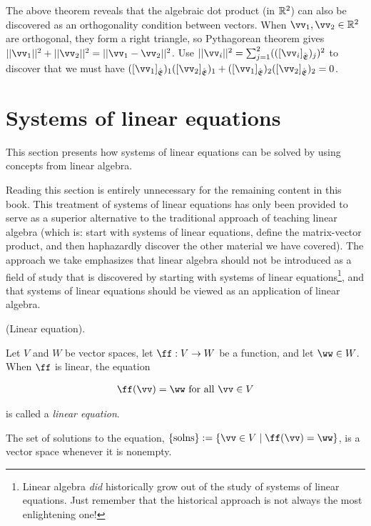 \begin{remark}
    The above theorem reveals that the algebraic dot product (in $\mathbb{R}^2$) can also be discovered as an orthogonality condition between vectors. When $\vv_1, \vv_2 \in \R^2$ are orthogonal, they form a right triangle, so Pythagorean theorem gives $||\vv_1||^2 + ||\vv_2||^2 = ||\vv_1 - \vv_2||^2$. Use $||\vv_i||^2 = \sum_{j = 1}^2 (([\vv_i]_\sE)_j)^2$ to discover that we must have $([\vv_1]_\sE)_1 ([\vv_2]_\sE)_1 + ([\vv_1]_\sE)_2 ([\vv_2]_\sE)_2 = 0$.
\end{remark}

\newpage

\section{Systems of linear equations}

This section presents how systems of linear equations can be solved by using concepts from linear algebra.

Reading this section is entirely unnecessary for the remaining content in this book. This treatment of systems of linear equations has only been provided to serve as a superior alternative to the traditional approach of teaching linear algebra (which is: start with systems of linear equations, define the matrix-vector product, and then haphazardly discover the other material we have covered). The approach we take emphasizes that linear algebra should not be introduced as a field of study that is discovered by starting with systems of linear equations\footnote{Linear algebra \textit{did} historically grow out of the study of systems of linear equations. Just remember that the historical approach is not always the most enlightening one!}, and that systems of linear equations should be viewed as an application of linear algebra.

\begin{defn}
    (Linear equation).

    Let $V$ and $W$ be vector spaces, let $\ff:V \rightarrow W$ be a function, and let $\ww \in W$. When $\ff$ is linear, the equation
    
    \begin{align*}
        \ff(\vv) = \ww \text{ for all $\vv \in V$}
    \end{align*}
    
    is called a \textit{linear equation}.

    The set of solutions to the equation, $\{\text{solns}\} := \{\vv \in V \mid \ff(\vv) = \ww\}$, is a vector space whenever it is nonempty.
\end{defn}

